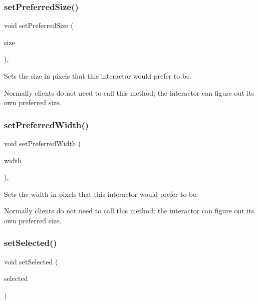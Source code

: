 \subsubsection{\texorpdfstring{set\+Preferred\+Size()}{setPreferredSize()}\hspace{0.1cm}{\footnotesize\ttfamily [2/2]}}
{\footnotesize\ttfamily void set\+Preferred\+Size (\begin{DoxyParamCaption}\item[{const \mbox{\hyperlink{structGDimension}{G\+Dimension}} \&}]{size }\end{DoxyParamCaption})\hspace{0.3cm}{\ttfamily [virtual]}, {\ttfamily [inherited]}}



Sets the size in pixels that this interactor would prefer to be. 

Normally clients do not need to call this method; the interactor can figure out its own preferred size. \mbox{\label{classGInteractor_a3db429ab2fa52efd187eec0ed8cdd9f2}} 
\subsubsection{\texorpdfstring{set\+Preferred\+Width()}{setPreferredWidth()}}
{\footnotesize\ttfamily void set\+Preferred\+Width (\begin{DoxyParamCaption}\item[{double}]{width }\end{DoxyParamCaption})\hspace{0.3cm}{\ttfamily [virtual]}, {\ttfamily [inherited]}}



Sets the width in pixels that this interactor would prefer to be. 

Normally clients do not need to call this method; the interactor can figure out its own preferred size. \mbox{\label{classGCheckBox_ad42accd39af295a957386c68dac3dcae}} 
\subsubsection{\texorpdfstring{set\+Selected()}{setSelected()}}
{\footnotesize\ttfamily void set\+Selected (\begin{DoxyParamCaption}\item[{bool}]{selected }\end{DoxyParamCaption})\hspace{0.3cm}{\ttfamily [virtual]}}



